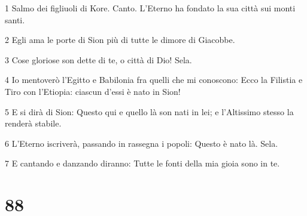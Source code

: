 \par 1 Salmo dei figliuoli di Kore. Canto. L'Eterno ha fondato la sua città sui monti santi.
\par 2 Egli ama le porte di Sion più di tutte le dimore di Giacobbe.
\par 3 Cose gloriose son dette di te, o città di Dio! Sela.
\par 4 Io mentoverò l'Egitto e Babilonia fra quelli che mi conoscono: Ecco la Filistia e Tiro con l'Etiopia: ciascun d'essi è nato in Sion!
\par 5 E si dirà di Sion: Questo qui e quello là son nati in lei; e l'Altissimo stesso la renderà stabile.
\par 6 L'Eterno iscriverà, passando in rassegna i popoli: Questo è nato là. Sela.
\par 7 E cantando e danzando diranno: Tutte le fonti della mia gioia sono in te.

\chapter{88}

